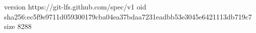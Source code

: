version https://git-lfs.github.com/spec/v1
oid sha256:ec5f9e9711d059300179cba04ea37bdaa7231eadbb53e3045e6421113db719c7
size 8288
